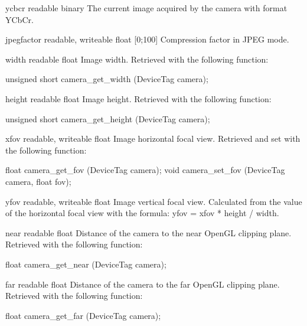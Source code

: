 \begin{itemize}
\begin{attribute}{ycbcr}
  {readable}
  {binary}
  {}
  The current image acquired by the camera with format YCbCr.
\end{attribute}

\begin{attribute}{jpegfactor}
  {readable, writeable}
  {float}
  {[0;100]}
  Compression factor in JPEG mode.
\end{attribute}

\begin{attribute}{width}
  {readable}
  {float}
  {}
  Image width. Retrieved with the following \webots function:
\begin{cxx}
unsigned short camera_get_width (DeviceTag camera);
\end{cxx}
\end{attribute}

\begin{attribute}{height}
  {readable}
  {float}
  {}
  Image height. Retrieved with the following \webots function:
\begin{cxx}
unsigned short camera_get_height (DeviceTag camera);
\end{cxx}
\end{attribute}

\begin{attribute}{xfov}
  {readable, writeable}
  {float}
  {}
  Image horizontal focal view.  Retrieved and set with
  the following \webots function:
\begin{cxx}
float camera_get_fov (DeviceTag camera);
void camera_set_fov (DeviceTag camera, float fov);
\end{cxx}
\end{attribute}

\begin{attribute}{yfov}
  {readable, writeable}
  {float}
  {}
  Image vertical focal view. Calculated from the value of
  the horizontal focal view with the formula: yfov = xfov * height /
  width.
\end{attribute}

\begin{attribute}{near}
  {readable}
  {float}
  {}
  Distance of the camera to the near OpenGL clipping
  plane.  Retrieved with the following \webots function:
\begin{cxx}
float camera_get_near (DeviceTag camera);
\end{cxx}
\end{attribute}

\begin{attribute}{far}
  {readable}
  {float}
  {}
  Distance of the camera to the far OpenGL clipping
  plane.  Retrieved with the following \webots function:
\begin{cxx}
float camera_get_far (DeviceTag camera);
\end{cxx}
\end{attribute}
\end{itemize}

